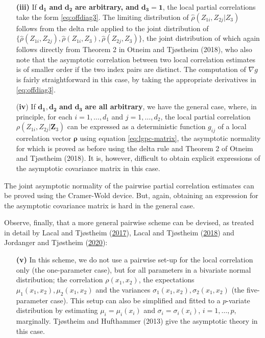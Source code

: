 \documentclass[
  12pt,
  letterpaper]{article}
\numberwithin{equation}{section}
\newcommand{\Z}{\bm{Z}}
\newcommand{\frho}{\bm{\rho}}
\begin{document}
\begin{itemize}
\item[\textbf{(iii)}] If $\bm{d_1}$ \textbf{and} $\bm{d_2}$ \textbf{are arbitrary, and} $\bm{d_3 = 1}$, the local partial correlations take the form \eqref{eq:offdiag3}. The limiting distribution of $\widehat\rho(Z_{1i}, Z_{2j}|Z_3)$ follows from the delta rule applied to the joint distribution of $\{\widehat\rho(Z_{1i}, Z_{2j}), \widehat\rho(Z_{1i}, Z_3), \widehat\rho(Z_{2j}, Z_3)\}$, the joint distribution of which again follows directly from Theorem 2 in Otneim and Tjøstheim (2018), who also note that the asymptotic correlation between two local correlation estimates is of smaller order if the two index pairs are distinct. The computation of $\nabla g$ is fairly straightforward in this case, by taking the appropriate derivatives in \eqref{eq:offdiag3}.

\item[(\textbf{iv})] If $\bm{d_1, d_2}$ \textbf{and} $\bm{d_3}$ \textbf{are all arbitrary}, we have the general case, where, in principle, for each $i=1,\ldots,d_1$ and $j=1,\ldots,d_2$, the local partial correlation $\rho(Z_{1i}, Z_{2j}|\Z_3)$ can be expressed as a deterministic function $g_{ij}$ of a local correlation vector $\frho$ using equation \eqref{eq:lgpc-matrix}, the asymptotic normality for which is proved as before using the delta rule and Theorem 2 of Otneim and Tjøstheim (2018). It is, however, difficult to obtain explicit expressions of the asymptotic covariance matrix in this case.
\end{itemize}

The joint asymptotic normality of the pairwise partial correlation estimates can be proved using the Cramer-Wold device. But, again, obtaining an expression for the asymptotic covariance matrix is hard in the general case.

Observe, finally, that a more general pairwise scheme can be devised, as treated in detail by Lacal and Tjøstheim (\protect\hyperlink{ref-lacal2017local}{2017}), Lacal and Tjøstheim (\protect\hyperlink{ref-lacal2018estimating}{2018}) and Jordanger and Tjøstheim (\protect\hyperlink{ref-jordanger2017nonlinear}{2020}):

\begin{itemize}
\item[\textbf{(v)}] In this scheme, we do not use a pairwise set-up for the local correlation only (the one-parameter case), but for all parameters in a bivariate normal distribution; the correlation $\rho(x_1, x_2)$, the expectations $\mu_1(x_1,x_2), \mu_2(x_1,x_2)$ and the variances $\sigma_1(x_1,x_2),\sigma_2(x_1,x_2)$ (the five-parameter case). This setup can also be simplified and fitted to a $p$-variate distribution by estimating $\mu_i = \mu_i(x_i)$ and $\sigma_i = \sigma_i(x_i)$, $i=1,\ldots,p$, marginally. Tjøstheim and Hufthammer (2013) give the asymptotic theory in this case. 
\end{itemize}
\end{document}
